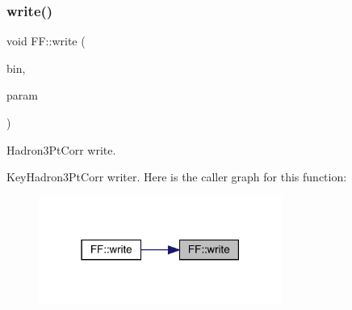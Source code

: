 \subsubsection{\texorpdfstring{write()}{write()}\hspace{0.1cm}{\footnotesize\ttfamily [13/13]}}
{\footnotesize\ttfamily void F\+F\+::write (\begin{DoxyParamCaption}\item[{\mbox{\hyperlink{classADATIO_1_1BinaryWriter}{Binary\+Writer}} \&}]{bin,  }\item[{const \mbox{\hyperlink{structFF_1_1KeyHadron3PtCorr__t}{Key\+Hadron3\+Pt\+Corr\+\_\+t}} \&}]{param }\end{DoxyParamCaption})}



Hadron3\+Pt\+Corr write. 

Key\+Hadron3\+Pt\+Corr writer. Here is the caller graph for this function\+:
\nopagebreak
\begin{figure}[H]
\begin{center}
\leavevmode
\includegraphics[width=226pt]{d5/da6/namespaceFF_a7d3abdd11ac7f8c96ec4cfab1360b20a_icgraph}
\end{center}
\end{figure}
